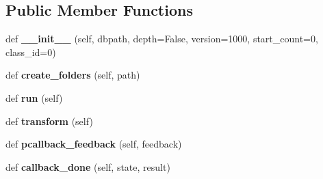 \subsection*{Public Member Functions}
\begin{DoxyCompactItemize}
\item 
\mbox{\label{classsim__animation_1_1sim__animation__manager_1_1SimAnimationManager_ab1bb84b1def8969a47d30f86b266a35f}} 
def {\bfseries \+\_\+\+\_\+init\+\_\+\+\_\+} (self, dbpath, depth=False, version=1000, start\+\_\+count=0, class\+\_\+id=0)
\item 
\mbox{\label{classsim__animation_1_1sim__animation__manager_1_1SimAnimationManager_a834eb13bf0e97d80eab79a84c76bd87a}} 
def {\bfseries create\+\_\+folders} (self, path)
\item 
\mbox{\label{classsim__animation_1_1sim__animation__manager_1_1SimAnimationManager_addde91d938af8d65ac8c066dfe1d9671}} 
def {\bfseries run} (self)
\item 
\mbox{\label{classsim__animation_1_1sim__animation__manager_1_1SimAnimationManager_a8e0183e87e390a3941fc2a0be0e882b2}} 
def {\bfseries transform} (self)
\item 
\mbox{\label{classsim__animation_1_1sim__animation__manager_1_1SimAnimationManager_a2e55e31c1b00125dd52cf178ffd3e737}} 
def {\bfseries pcallback\+\_\+feedback} (self, feedback)
\item 
\mbox{\label{classsim__animation_1_1sim__animation__manager_1_1SimAnimationManager_a5ed14cb1b323f141ceb8550101e7ad36}} 
def {\bfseries callback\+\_\+done} (self, state, result)
\end{DoxyCompactItemize}
